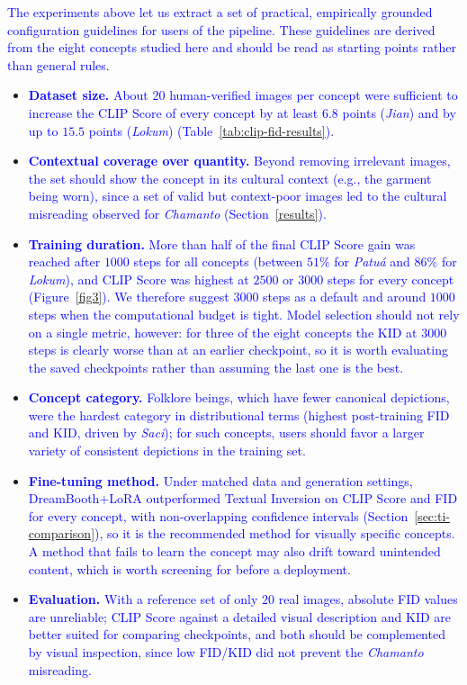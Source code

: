 \documentclass[pdflatex,sn-mathphys-num]{sn-jnl}%
\theoremstyle{thmstyleone}%
\theoremstyle{thmstyletwo}%
\theoremstyle{thmstylethree}%
\begin{document}
\textcolor{blue}{The experiments above let us extract a set of practical, empirically grounded configuration guidelines for users of the pipeline. These guidelines are derived from the eight concepts studied here and should be read as starting points rather than general rules.}
\begin{itemize}
    \item \textcolor{blue}{\textbf{Dataset size.} About $20$ human-verified images per concept were sufficient to increase the CLIP Score of every concept by at least $6.8$ points (\textit{Jian}) and by up to $15.5$ points (\textit{Lokum}) (Table~\ref{tab:clip-fid-results}).}
    \item \textcolor{blue}{\textbf{Contextual coverage over quantity.} Beyond removing irrelevant images, the set should show the concept in its cultural context (e.g., the garment being worn), since a set of valid but context-poor images led to the cultural misreading observed for \textit{Chamanto} (Section~\ref{results}).}
    \item \textcolor{blue}{\textbf{Training duration.} More than half of the final CLIP Score gain was reached after $1000$ steps for all concepts (between $51\%$ for \textit{Patu\'a} and $86\%$ for \textit{Lokum}), and CLIP Score was highest at $2500$ or $3000$ steps for every concept (Figure~\ref{fig3}). We therefore suggest $3000$ steps as a default and around $1000$ steps when the computational budget is tight. Model selection should not rely on a single metric, however: for three of the eight concepts the KID at $3000$ steps is clearly worse than at an earlier checkpoint, so it is worth evaluating the saved checkpoints rather than assuming the last one is the best.}
    \item \textcolor{blue}{\textbf{Concept category.} Folklore beings, which have fewer canonical depictions, were the hardest category in distributional terms (highest post-training FID and KID, driven by \textit{Saci}); for such concepts, users should favor a larger variety of consistent depictions in the training set.}
    \item \textcolor{blue}{\textbf{Fine-tuning method.} Under matched data and generation settings, DreamBooth+LoRA outperformed Textual Inversion on CLIP Score and FID for every concept, with non-overlapping confidence intervals (Section~\ref{sec:ti-comparison}), so it is the recommended method for visually specific concepts. A method that fails to learn the concept may also drift toward unintended content, which is worth screening for before a deployment.}
    \item \textcolor{blue}{\textbf{Evaluation.} With a reference set of only $20$ real images, absolute FID values are unreliable; CLIP Score against a detailed visual description and KID are better suited for comparing checkpoints, and both should be complemented by visual inspection, since low FID/KID did not prevent the \textit{Chamanto} misreading.}
\end{itemize}
\end{document}
